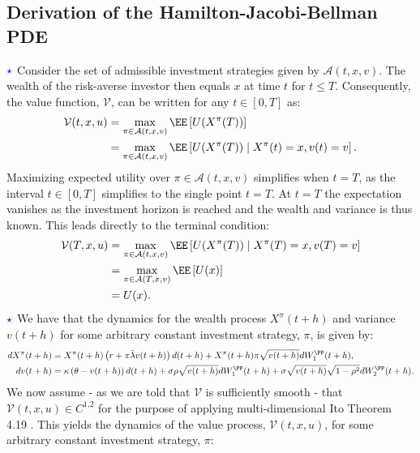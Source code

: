 \documentclass[11pt]{article}
\numberwithin{equation}{section}
\def\c#1{\mathcal{#1}}
\begin{document}
\subsection{Derivation of the Hamilton-Jacobi-Bellman PDE}
$\textcolor{blue}{\star}$ Consider the set of admissible investment strategies given by
$\mathcal{A}(t,x,v)$. The wealth of the risk-averse investor then equals $x$ at
time $t$ for $t\leq T$. Consequently, the value function, $\mathcal{V}$, can be
written for any $t\in [0,T]$ as:
\begin{align*}
    \mathcal{V}(t,x,u)&=\max_{\pi\in \c{A}(t,x,v)} \EE \left [ U(X^\pi(T))\right ]\\
    &=\max_{\pi\in \mathcal{A}(t,x,v)} \EE \left [ U(X^\pi(T)) \mid X^\pi(t) =x, v(t)=v\right ].
\end{align*}
Maximizing expected utility over $\pi \in \c{A}(t, x, v)$ simplifies when $t =
T$, as the interval $t \in [0, T]$ simplifies to the single point $t = T$. At
$t=T$ the expectation vanishes as the investment horizon is reached and the
wealth and variance is thus known. This
leads directly to the terminal condition:
\begin{align*}
    \mathcal{V}(T,x,u)&=\max_{\pi\in \mathcal{A}(t,x,v)} \EE \left [ U(X^\pi(T)) \mid X^\pi(T) =x, v(T)=v\right ]\\
    &=\max_{\pi\in \c{A}(T,x,v)} \EE \left [ U(x)\right ]\\
    &=U(x).
\end{align*}
$\textcolor{blue}{\star}$ We have that the dynamics for the wealth process
$X^\pi(t + h)$ and variance $v(t + h)$ for some arbitrary constant investment strategy,
$\pi$, is given by:
\begin{align*}
    dX^\pi(t + h) &= X^\pi(t + h) \left( r + \pi \bar{\lambda} v(t + h) \right) d(t + h) + X^\pi(t + h) \pi \sqrt{v(t + h)} dW^{\PP}_1(t + h),\\
    dv(t + h) &= \kappa \left( \theta - v(t + h) \right) d(t + h) + \sigma \rho \sqrt{v(t + h)} dW^{\PP}_1(t + h) + \sigma \sqrt{v(t + h)} \sqrt{1 - \rho^2} dW^{\PP}_2(t + h).
\end{align*}
\newpage
We now assume - as we are told that $\mathcal{V}$ is sufficiently smooth - that $\mathcal{V}(t,x,u)\in C^{\text{1,2}}$ for the purpose of
applying multi-dimensional Ito Theorem 4.19 \cite{bjork2020}. This yields the
dynamics of the value process, $\mathcal{V}(t,x,u)$, for some arbitrary
constant investment strategy, $\pi$:
\end{document}
